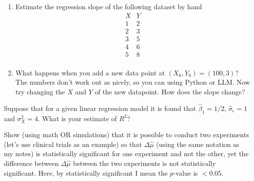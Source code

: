 \begin{exercise}
\begin{enumerate}
\item  Estimate the regression slope of the following dataset by hand 
\[
\begin{array}{c|c}
X & Y \\\hline
1 & 2 \\
2 & 3 \\
3 & 5 \\
4 & 6 \\
5 & 8 \\
\end{array}
\]
\item What happens when you add a new data point at $(X_6,Y_6) = (100,3)$? The numbers don't work out as nicely, so you can using Python or LLM. Now try changing the $X$ and $Y$ of the new datapoint. How does the slope change? 
\end{enumerate}

\end{exercise} 

\begin{exercise}
Suppose that for a given linear regression model it is found that $\hat{\beta}_1 = 1/2$, $\hat{\sigma}_{\epsilon} = 1$ and $\sigma_X^2 = 4$. What is your estimate of $R^2$? 
\end{exercise}

\begin{exercise}
Show (using math OR simulations) that it is possible to conduct two experiments (let's use clinical trials as an example) so that $\Delta \hat{\mu}$ (using the same notation as my notes) is statistically significant for one experiment and not the other, yet the difference between $\Delta \hat{\mu}$ between the two experiments is not statistically significant.  Here, by statistically significant I mean the $p$-value is $<0.05$. 
\end{exercise}

